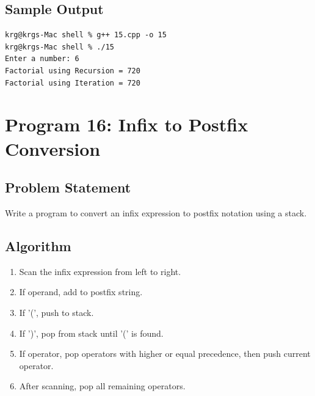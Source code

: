 \documentclass[a4paper,12pt]{article}
\begin{document}
\subsection*{Sample Output}
\begin{lstlisting}[style=outputstyle]
krg@krgs-Mac shell % g++ 15.cpp -o 15
krg@krgs-Mac shell % ./15
Enter a number: 6
Factorial using Recursion = 720
Factorial using Iteration = 720
\end{lstlisting}

\newpage

\section*{Program 16: Infix to Postfix Conversion}

\subsection*{Problem Statement}
Write a program to convert an infix expression to postfix notation using a stack.

\subsection*{Algorithm}
\begin{enumerate}
    \item Scan the infix expression from left to right.
    \item If operand, add to postfix string.
    \item If '(', push to stack.
    \item If ')', pop from stack until '(' is found.
    \item If operator, pop operators with higher or equal precedence, then push current operator.
    \item After scanning, pop all remaining operators.
\end{enumerate}
\end{document}
